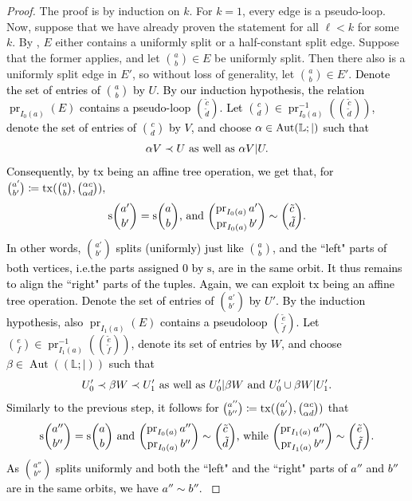 \documentclass[a4paper,reqno, cleveref]{amsart}
\newcommand{\coloneqq}{\mathrel{\mathop:}\mathrel{\mkern-1.2mu}=}
\newcommand{\struct}[1]{\mathbb{#1}}
\newcommand{\s}{\ensuremath{\mathrm{s}}\xspace}
\DeclareMathOperator{\pr}{pr}
\DeclareMathOperator{\Aut}{Aut}
\newcommand{\sA}{\mathbb A}
\newcommand{\sG}{\mathbb G}
\newcommand{\sL}{\mathbb L}
\newcommand{\bin}{E}
\newcommand{\Phylo}[1]{\ensuremath{(\struct{L};|)}#1}
\newcommand{\tx}{\ensuremath{\mathrm{tx}}\xspace}
\newcommand\mo[1]{\textcolor{black}{#1}} %
\begin{document}
\begin{proof}
    The proof is by induction on $k$. 
    For $k=1$, every edge is a pseudo-loop.
    Now, suppose that we have already proven the statement for all $\ell<k$ for some $k$.
    By , $\bin$ either contains a uniformly split or a half-constant split edge. 
    Suppose that the former applies, and let $\binom{a}{b}\in\bin$ be uniformly split.
    Then there also is a uniformly split edge in $\bin'$, so without loss of generality, let $\binom{a}{b}\in\bin'$.
    \mo{Denote the set of entries of $\binom{a}{b}$ by $U$.
    By our induction hypothesis, the relation $\pr_{I_0(a)}(\bin)$ contains a pseudo-loop $\binom{\tilde c}{\tilde d}$. 
    Let $\binom{c}{d}\in\pr_{I_0(a)}^{-1}(\binom{\tilde c}{\tilde d})$, denote the set of entries of $\binom{c}{d}$ by $V$, and choose $\alpha\in\Aut\Phylo$ such that 
    \[
        \alpha V\prec U \textnormal{ as well as } \alpha V|U.
    \]
    Consequently, by $\tx$ being an affine tree operation, we get that, for $\binom{a'}{b'}\coloneqq\tx(\binom{a}{b},\binom{\alpha c}{\alpha d}),$
    \[
    \s\binom{a'}{b'}=\s\binom{a}{b}  \textnormal{, and }\binom{\pr_{I_0(a)}a'}{\pr_{I_0(a)}b'}\sim\binom{\tilde c}{\tilde d}.
    \]
    In other words, $\binom{a'}{b'}$ splits (uniformly) just like $\binom{a}{b}$, and the ``left" parts of both vertices, i.e.\;the parts assigned $0$ by $\s$, are in the same orbit.
    It thus remains to align the ``right" parts of the tuples.
    Again, we can exploit $\tx$ being an affine tree operation.
    Denote the set of entries of $\binom{a'}{b'}$ by $U'$.
    By the induction hypothesis, also $\pr_{I_1(a)}(\bin)$ contains a pseudoloop $\binom{\tilde e}{\tilde f}$. 
    Let $\binom{e}{f}\in\pr_{I_1(a)}^{-1}(\binom{\tilde e}{\tilde f})$, denote its set of entries by $W$, and choose $\beta\in\Aut(\Phylo)$ such that 
    \[
        U'_0\prec \beta W\prec U'_1 \textnormal{ as well as } U'_0| \beta W \textnormal{ and } U'_0\cup\beta W|U'_1.
    \]
    Similarly to the previous step, it follows for $\binom{a''}{b''}\coloneqq\tx(\binom{a'}{b'},\binom{\alpha c}{\alpha d})$ that
    \[
    \s\binom{a''}{b''}=\s\binom{a}{b}\textnormal{ and } \binom{\pr_{I_0(a)} a''}{\pr_{I_0(a)} b''}\sim\binom{\tilde c}{\tilde d}\textnormal{, while }
    \binom{\pr_{I_1(a)} a''}{\pr_{I_1(a)} b''}\sim\binom{\tilde e}{\tilde f}.
    \]
    As $\binom{a''}{b''}$ splits uniformly and both the ``left" and the ``right" parts of $a''$ and $b''$ are in the same orbits, we have $a''\sim b''$.
    }


\end{proof}
\end{document}
